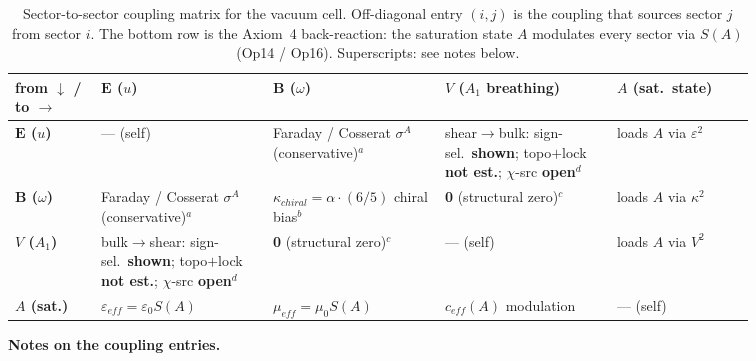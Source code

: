 \begin{table}[htbp]
\centering\footnotesize
\setlength{\tabcolsep}{3pt}
\renewcommand{\arraystretch}{1.3}
\begin{tabular}{@{}p{0.10\linewidth} p{0.20\linewidth} p{0.20\linewidth} p{0.20\linewidth} p{0.16\linewidth}@{}}
\toprule
\textbf{from $\downarrow$ / to $\rightarrow$} & \textbf{$\mathbf{E}$ ($u$)} & \textbf{$\mathbf{B}$ ($\omega$)} & \textbf{$V$ ($A_1$ breathing)} & \textbf{$A$ (sat.\ state)} \\
\midrule
\textbf{$\mathbf{E}$ ($u$)} & --- (self) & Faraday / Cosserat $\sigma^A$ (conservative)$^a$ & shear$\to$bulk: sign-sel.\ \textbf{shown}; topo$+$lock \textbf{not est.}; $\chi$-src \textbf{open}$^d$ & loads $A$ via $\varepsilon^2$ \\
\textbf{$\mathbf{B}$ ($\omega$)} & Faraday / Cosserat $\sigma^A$ (conservative)$^a$ & $\kappa_{chiral} = \alpha\cdot(6/5)$ chiral bias$^b$ & \textbf{0} (structural zero)$^c$ & loads $A$ via $\kappa^2$ \\
\textbf{$V$ ($A_1$)} & bulk$\to$shear: sign-sel.\ \textbf{shown}; topo$+$lock \textbf{not est.}; $\chi$-src \textbf{open}$^d$ & \textbf{0} (structural zero)$^c$ & --- (self) & loads $A$ via $V^2$ \\
\textbf{$A$ (sat.)} & $\varepsilon_{eff} = \varepsilon_0 S(A)$ & $\mu_{eff} = \mu_0 S(A)$ & $c_{eff}(A)$ modulation & --- (self) \\
\bottomrule
\end{tabular}
\caption{Sector-to-sector coupling matrix for the vacuum cell. Off-diagonal entry $(i,j)$ is the coupling that sources sector $j$ from sector $i$. The bottom row is the Axiom~4 back-reaction: the saturation state $A$ modulates every sector via $S(A)$ (Op14 / Op16). Superscripts: see notes below.}
\label{tab:vol9_sector_coupling}
\end{table}

\noindent\textbf{Notes on the coupling entries.}

